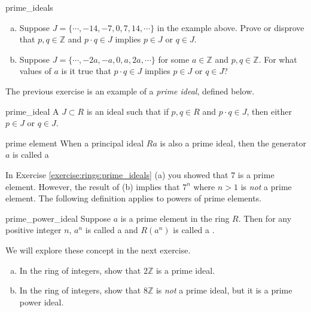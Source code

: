 \begin{exercise}{prime_ideals}
\begin{enumerate}[(a)]
\item Suppose $J=\{\cdots,-14,-7,0,7,14,\cdots\}$ in the example above.  Prove or disprove that $p,q\in{\mathbb Z}$ and $p\cdot q\in J$ implies $p\in J$ or $q\in J$.
\item Suppose $J=\{\cdots,-2a,-a,0,a,2a,\cdots\}$ for some $a\in{\mathbb Z}$ and $p,q\in{\mathbb Z}$.  For what values of $a$ is it true that $p\cdot q\in J$ implies $p\in J$ or $q\in J$? 
\end{enumerate}
\end{exercise}

The previous exercise is an example of a \emph{prime ideal}, defined below. 

\begin{defn}{prime_ideal}
A  $J\subset R$ is an ideal such that if $p,q\in R$ and $p\cdot q\in J$, then either $p\in J$ or $q\in J$.
\end{defn}

\begin{defn}{prime element}
When a principal ideal $Ra$ is also a prime ideal, then the generator $a$ is called a 
\end{defn}

In Exercise \ref{exercise:rings:prime_ideals} (a) you showed that $7$ is a prime element.  However, the result of (b) implies that $7^n$ where $n>1$ is \emph{not} a prime element.  The following definition applies to powers of prime elements.

\begin{defn}{prime_power_ideal}
Suppose $a$ is a prime element in the ring $R$.  Then for any positive integer $n$, $a^n$ is called a  and $R(a^n)$ is called a .
\end{defn}

We will explore these concept in the next exercise.

\begin{exercise}{}
\begin{enumerate}[(a)]
\item In the ring of integers, show that $2{\mathbb Z}$ is a prime ideal.
\item In the ring of integers, show that $8{\mathbb Z}$ is \emph{not} a prime ideal, but it is a prime power ideal.
\end{enumerate}
\end{exercise}

